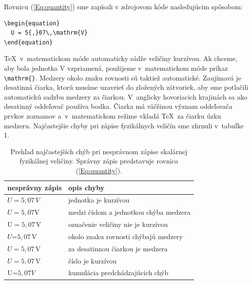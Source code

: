 Rovnicu (\ref{Eq:quantity}) sme zapísali v zdrojovom kóde nasledujúcim spôsobom:
\begin{verbatim}
\begin{equation}
  U = 5{,}07\,\mathrm{V}
\end{equation}
\end{verbatim}
\TeX\ v~matematickom móde automaticky sádže veličiny kurzívou.
Ak chceme, aby bola jednotka V vzpriamená, použijeme
v~matematickom móde príkaz \verb|\mathrm{}|. Medzery okolo znaku rovnosti sú taktiež automatické.
Zaujímavá je desatinná čiarka, ktorú musíme uzavrieť do 
zložených zátvoriek, aby sme potlačili automatickú sadzbu
medzery za čiarkou.
V~anglicky hovoriacich krajinách sa ako desatinný oddeľovač
používa bodka.
Čiarka má väčšinou význam oddeľovača prvkov zoznamov
a~v~matematickom režime vkladá \TeX\, za čiarku úzku medzeru.
Najčastejšie chyby pri zápise fyzikálnych veličín sme zhrnuli
v~tabuľke 1.

\begin{table}[h]
\centering
\caption{Prehľad najčastejších chýb pri nesprávnom zápise 
skalárnej fyzikálnej veličiny.
Správny zápis predstavuje rovnica (\ref{Eq:quantity}).}
\vspace{12pt}
\begin{tabular}{@{}ll@{}}
  \toprule
  \textbf{nesprávny zápis} & \textbf{opis chyby}\\
  \midrule
  $U = 5{,}07\,V$ & jednotka je kurzívou\\
  $U = 5{,}07\mathrm V$ & medzi číslom a jednotkou chýba medzera\\
  $\mathrm U = 5{,}07\,\mathrm V$ & označenie veličiny nie je kurzívou \\
  $U$=$5{,}07\,\mathrm V$ & okolo znaku rovnosti chýbajú medzery\\
  $U = 5,07\,\mathrm{V}$ & za desatinnou čiarkou je medzera\\
  $U = \mathit{5{,}07}\,\mathrm{V}$ & číslo je kurzívou\\
  U=$\mathit{5,07}V$ & kumulácia predchádzajúcich chýb\\
  \bottomrule
\end{tabular}
\end{table}

